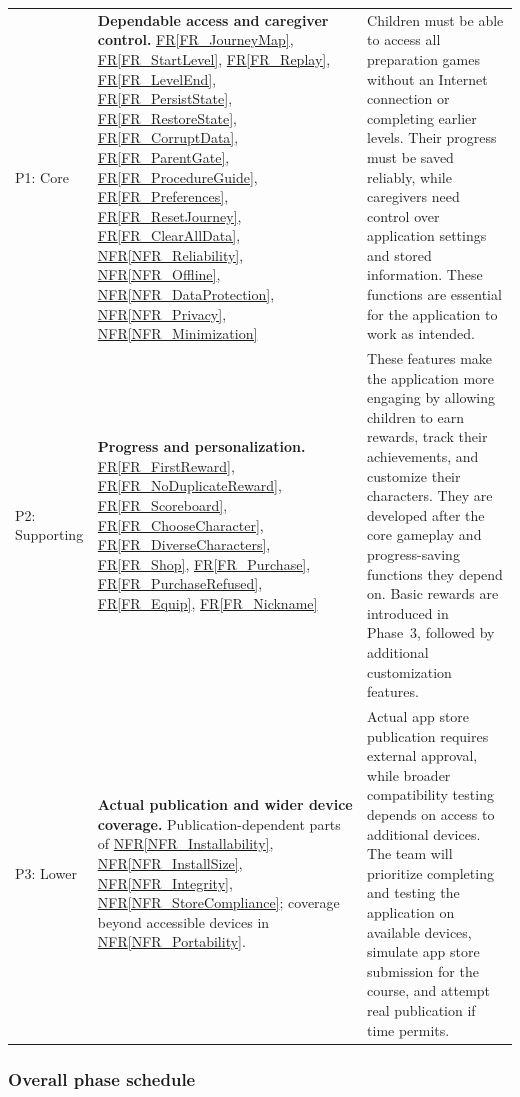 \documentclass[10pt]{article}
\newcommand{\rref}[1]{\hyperref[#1]{FR\ref*{#1}}}
\newcommand{\nfrref}[1]{\hyperref[#1]{NFR\ref*{#1}}}
\begin{document}
\begin{longtable}{@{}>{\raggedright\arraybackslash}p{}
>{\raggedright\arraybackslash}p{}
>{\raggedright\arraybackslash}p{}@{}}
P1: Core &
\textbf{Dependable access and caregiver control.}\newline
\rref{FR_JourneyMap},
\rref{FR_StartLevel},
\rref{FR_Replay},
\rref{FR_LevelEnd},
\rref{FR_PersistState},
\rref{FR_RestoreState},
\rref{FR_CorruptData},
\rref{FR_ParentGate},
\rref{FR_ProcedureGuide},
\rref{FR_Preferences},
\rref{FR_ResetJourney},
\rref{FR_ClearAllData},
\nfrref{NFR_Reliability},
\nfrref{NFR_Offline},
\nfrref{NFR_DataProtection},
\nfrref{NFR_Privacy},
\nfrref{NFR_Minimization} &
Children must be able to access all preparation games
without an Internet connection or completing earlier
levels. Their progress must be saved reliably, while
caregivers need control over application settings
and stored information. These functions are essential
for the application to work as intended. \\

P2: Supporting &
\textbf{Progress and personalization.}\newline
\rref{FR_FirstReward},
\rref{FR_NoDuplicateReward},
\rref{FR_Scoreboard},
\rref{FR_ChooseCharacter},
\rref{FR_DiverseCharacters},
\rref{FR_Shop},
\rref{FR_Purchase},
\rref{FR_PurchaseRefused},
\rref{FR_Equip},
\rref{FR_Nickname} &
These features make the application more engaging
by allowing children to earn rewards, track their
achievements, and customize their characters.
They are developed after the core gameplay and
progress-saving functions they depend on.
Basic rewards are introduced in Phase~3,
followed by additional customization features. \\

P3: Lower &
\textbf{Actual publication and wider device coverage.}\newline
Publication-dependent parts of
\nfrref{NFR_Installability},
\nfrref{NFR_InstallSize},
\nfrref{NFR_Integrity},
\nfrref{NFR_StoreCompliance};
coverage beyond accessible devices in
\nfrref{NFR_Portability}. &
Actual app store publication requires external
approval, while broader compatibility testing
depends on access to additional devices.
The team will prioritize completing and testing
the application on available devices, simulate
app store submission for the course, and attempt
real publication if time permits. \\

\end{longtable}
\endgroup
\subsubsection*{Overall phase schedule}
\end{document}

